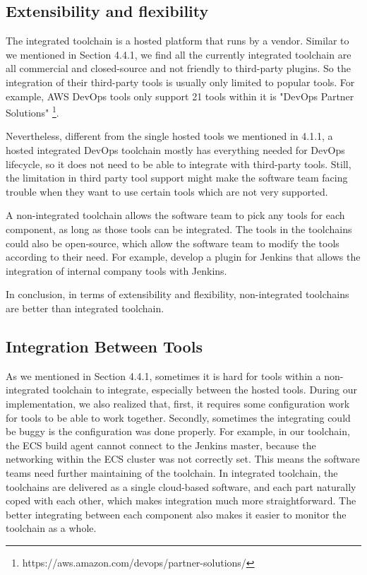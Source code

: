 \subsection{Extensibility and flexibility}
The integrated toolchain is a hosted platform that runs by a vendor. Similar to we mentioned in Section 4.4.1, we find all the currently integrated toolchain are all commercial and closed-source and not friendly to third-party plugins. So the integration of their third-party tools is usually only limited to popular tools. For example, AWS DevOps tools only support 21 tools within it is "DevOps Partner Solutions" \footnote{https://aws.amazon.com/devops/partner-solutions/}.
\par
Nevertheless, different from the single hosted tools we mentioned in 4.1.1, a hosted integrated DevOps toolchain mostly has everything needed for DevOps lifecycle, so it does not need to be able to integrate with third-party tools. Still, the limitation in third party tool support might make the software team facing trouble when they want to use certain tools which are not very supported.
\par
A non-integrated toolchain allows the software team to pick any tools for each component, as long as those tools can be integrated. The tools in the toolchains could also be open-source, which allow the software team to modify the tools according to their need. For example, develop a plugin for Jenkins that allows the integration of internal company tools with Jenkins.
\par
In conclusion, in terms of extensibility and flexibility, non-integrated toolchains are better than integrated toolchain.
\subsection{Integration Between Tools}
As we mentioned in Section 4.4.1, sometimes it is hard for tools within a non-integrated toolchain to integrate, especially between the hosted tools. 
During our implementation, we also realized that, first, it requires some configuration work for tools to be able to work together. Secondly, sometimes the integrating could be buggy is the configuration was done properly. For example, in our toolchain, the ECS build agent cannot connect to the Jenkins master, because the networking within the ECS cluster was not correctly set. This means the software teams need further maintaining of the toolchain.
In integrated toolchain, the toolchains are delivered as a single cloud-based software, and each part naturally coped with each other, which makes integration much more straightforward.
The better integrating between each component also makes it easier to monitor the toolchain as a whole.
